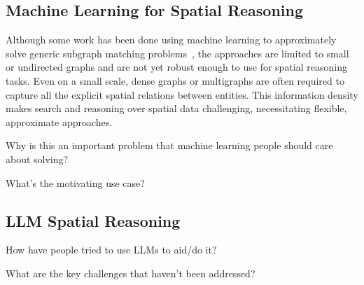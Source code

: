 \subsection{Machine Learning for Spatial Reasoning}
Although some work has been done using machine learning to approximately solve generic subgraph matching problems~\cite{Krlevza2016, Liu2020Neural,Lan2021,Roy2022}, the approaches are limited to small or undirected graphs and are not yet robust enough to use for spatial reasoning tasks.
Even on a small scale, dense graphs or multigraphs are often required to capture all the explicit spatial relations between entities.
This information density makes search and reasoning over spatial data challenging, necessitating flexible, approximate approaches.


Why is this an important problem that machine learning people should care about solving?

What's the motivating use case?




\subsection{LLM Spatial Reasoning}
How have people tried to use LLMs to aid/do it?

What are the key challenges that haven't been addressed?
